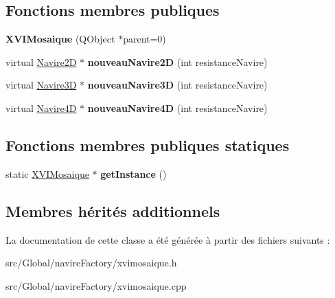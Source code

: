 \subsection*{Fonctions membres publiques}
\begin{DoxyCompactItemize}
\item 
{\bfseries X\+V\+I\+Mosaique} (Q\+Object $\ast$parent=0)\hypertarget{class_x_v_i_mosaique_a38b11b0ed946dda3f4ca6f6451cbfbe1}{}\label{class_x_v_i_mosaique_a38b11b0ed946dda3f4ca6f6451cbfbe1}

\item 
virtual \hyperlink{class_navire2_d}{Navire2D} $\ast$ {\bfseries nouveau\+Navire2D} (int resistance\+Navire)\hypertarget{class_x_v_i_mosaique_ac7c99628575c7afa11b2b09b9fe63563}{}\label{class_x_v_i_mosaique_ac7c99628575c7afa11b2b09b9fe63563}

\item 
virtual \hyperlink{class_navire3_d}{Navire3D} $\ast$ {\bfseries nouveau\+Navire3D} (int resistance\+Navire)\hypertarget{class_x_v_i_mosaique_ad1f2bac46ba0dccd0c48a003e0c32f5a}{}\label{class_x_v_i_mosaique_ad1f2bac46ba0dccd0c48a003e0c32f5a}

\item 
virtual \hyperlink{class_navire4_d}{Navire4D} $\ast$ {\bfseries nouveau\+Navire4D} (int resistance\+Navire)\hypertarget{class_x_v_i_mosaique_acaaf9df178a773bae1fe015285c65333}{}\label{class_x_v_i_mosaique_acaaf9df178a773bae1fe015285c65333}

\end{DoxyCompactItemize}
\subsection*{Fonctions membres publiques statiques}
\begin{DoxyCompactItemize}
\item 
static \hyperlink{class_x_v_i_mosaique}{X\+V\+I\+Mosaique} $\ast$ {\bfseries get\+Instance} ()\hypertarget{class_x_v_i_mosaique_a964d2479c49d9f13bbd77543a90dcfef}{}\label{class_x_v_i_mosaique_a964d2479c49d9f13bbd77543a90dcfef}

\end{DoxyCompactItemize}
\subsection*{Membres hérités additionnels}


La documentation de cette classe a été générée à partir des fichiers suivants \+:\begin{DoxyCompactItemize}
\item 
src/\+Global/navire\+Factory/xvimosaique.\+h\item 
src/\+Global/navire\+Factory/xvimosaique.\+cpp\end{DoxyCompactItemize}
